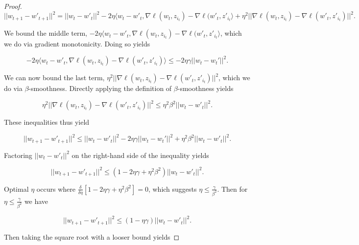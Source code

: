 \documentclass[twoside,11pt]{article}
\begin{document}
\begin{proof}
\begin{equation}
||w_{t+1} - w'_{t+1}||^2 = || w_{t} - w'_{t}||^2 -2\eta \langle w_t - w'_t, \nabla \ell(w_t, z_{i_t}) - \nabla \ell(w'_t, z'_{i_t} \rangle + \eta^2|| \nabla \ell(w_t, z_{i_t}) - \nabla \ell(w'_t, z'_{i_t})||^2.
\end{equation}

\noindent
We bound the middle term, $-2\eta \langle w_t - w'_t, \nabla \ell(w_t, z_{i_t}) - \nabla \ell(w'_t, z'_{i_t} \rangle$, which we do via gradient monotonicity. Doing so yields

\begin{equation}
-2\eta \langle w_t - w'_t, \nabla \ell(w_t, z_{i_t}) - \nabla \ell(w'_t, z'_{i_t}) \rangle \leq -2\eta\gamma || w_t - w_t' ||^2.
\end{equation}

\noindent
We can now bound the last term, $\eta^2|| \nabla \ell(w_t, z_{i_t}) - \nabla \ell(w'_t, z'_{i_t})||^2$, which we do via $\beta$-smoothness. Directly applying the definition of $\beta$-smoothness yields

\begin{equation}
\eta^2|| \nabla \ell(w_t, z_{i_t}) - \nabla \ell(w'_t, z'_{i_t})||^2 \leq \eta^2 \beta^2|| w_t - w'_t ||^2.
\end{equation}

\noindent
These inequalities thus yield

\begin{equation}
||w_{t+1} - w'_{t+1}||^2 \leq ||w_{t} - w'_{t}||^2 - 2\eta\gamma|| w_t - w_t' ||^2 + \eta^2 \beta^2|| w_t - w'_t ||^2.
\end{equation}

\noindent
Factoring $||w_{t} - w'_{t}||^2$ on the right-hand side of the inequality yields

\begin{equation}
||w_{t+1} - w'_{t+1}||^2 \leq (1-2\eta\gamma+\eta^2\beta^2)||w_{t} - w'_{t}||^2.
\end{equation}

\noindent
Optimal $\eta$ occurs where $\frac{\delta}{\delta \eta}[1-2\eta\gamma+\eta^2\beta^2]=0$, which suggests $\eta \leq \frac{\gamma}{\beta^2}$. Then for $\eta \leq \frac{\gamma}{\beta^2}$ we have 

\begin{equation}
||w_{t+1} - w'_{t+1}||^2 \leq (1-\eta\gamma)||w_{t} - w'_{t}||^2.
\end{equation}

\noindent
Then taking the square root with a looser bound yields


\end{proof}
\end{document}
